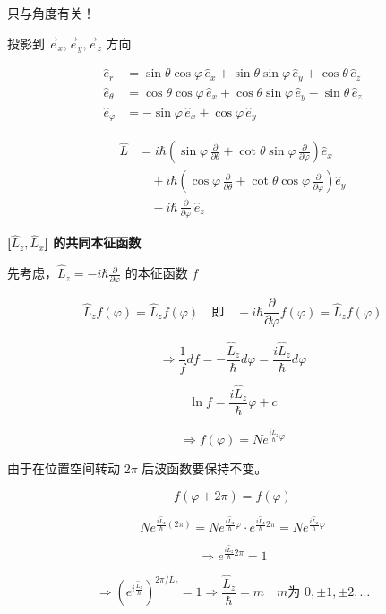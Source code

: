 \documentclass[lang=cn,10pt]{elegantbook}
\begin{document}
只与角度有关！

投影到 \(\vec{e}_x, \vec{e}_y, \vec{e}_z\) 方向

\[
\begin{aligned}
	\hat{e}_r &= \sin \theta \cos \varphi \, \hat{e}_x + \sin \theta \sin \varphi \, \hat{e}_y + \cos \theta \, \hat{e}_z \\
	\hat{e}_\theta &= \cos \theta \cos \varphi \, \hat{e}_x + \cos \theta \sin \varphi \, \hat{e}_y - \sin \theta \, \hat{e}_z \\
	\hat{e}_\varphi &= -\sin \varphi \, \hat{e}_x + \cos \varphi \, \hat{e}_y
\end{aligned}
\]

\[
\begin{aligned}
	\hat{L} &= i \hbar \left( \sin \varphi \, \frac{\partial}{\partial \theta} + \cot \theta \sin \varphi \, \frac{\partial}{\partial \varphi} \right) \hat{e}_x \\
	&\quad + i \hbar \left( \cos \varphi \, \frac{\partial}{\partial \theta} + \cot \theta \cos \varphi \, \frac{\partial}{\partial \varphi} \right) \hat{e}_y \\
	&\quad - i \hbar \, \frac{\partial}{\partial \varphi} \, \hat{e}_z
\end{aligned}
\]


\textbf{[\(\hat{L}_z, \hat{L}_x\)] 的共同本征函数}

先考虑，\(\hat{L}_z = -i\hbar \frac{\partial}{\partial \varphi}\) 的本征函数 \(f\)

\[
\hat{L}_z f(\varphi) = \hat{L}_z f(\varphi) \quad \text{即} \quad -i\hbar \frac{\partial}{\partial \varphi} f(\varphi) = \hat{L}_z f(\varphi)
\]

\[
\Rightarrow \frac{1}{f} df = -\frac{\hat{L}_z}{\hbar} d\varphi = \frac{i\hat{L}_z}{\hbar} d\varphi
\]

\[
\ln f = \frac{i\hat{L}_z}{\hbar} \varphi + c
\]

\[
\Rightarrow f(\varphi) = N e^{\frac{i\hat{L}_z}{\hbar} \varphi}
\]

由于在位置空间转动 \(2\pi\) 后波函数要保持不变。

\[
f(\varphi + 2\pi) = f(\varphi)
\]

\[
N e^{\frac{i\hat{L}_z}{\hbar} (2\pi)} = N e^{\frac{i\hat{L}_z}{\hbar} \varphi} \cdot e^{\frac{i\hat{L}_z}{\hbar} 2\pi} = N e^{\frac{i\hat{L}_z}{\hbar} \varphi}
\]

\[
\Rightarrow e^{\frac{i\hat{L}_z}{\hbar} 2\pi} = 1
\]

\[
\Rightarrow (e^{i\frac{\hat{L}_z}{\hbar}})^{2\pi/\hat{L}_z} = 1 \Rightarrow \frac{\hat{L}_z}{\hbar} = m \quad m \text{为 } 0, \pm1, \pm2, \ldots
\]
\end{document}
